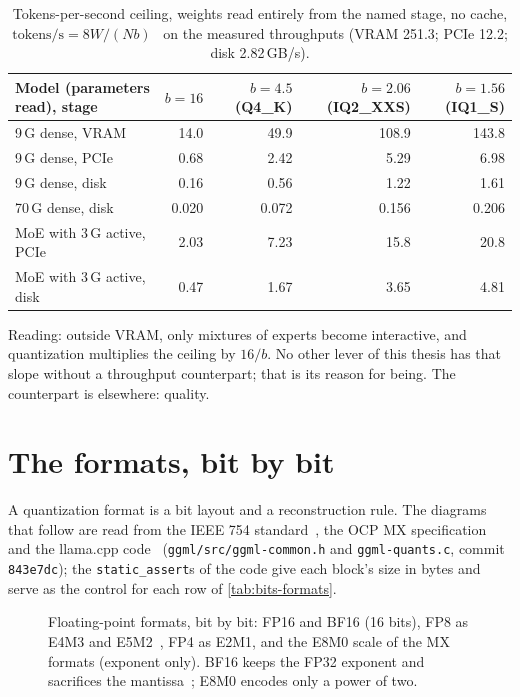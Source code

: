 \begin{table}[ht]
\centering\small
\caption[Ceilings versus bits per weight]{Tokens-per-second ceiling, weights read entirely from the named stage, no cache, $\text{tokens/s} = 8W/(Nb)$ \calc~on the measured throughputs (VRAM 251.3; PCIe 12.2; disk 2.82\,GB/s).}
\label{tab:quant-plafonds}
\begin{tabular}{@{}lrrrr@{}}
\toprule
Model (parameters read), stage & $b=16$ & $b=4.5$ (Q4\_K) & $b=2.06$ (IQ2\_XXS) & $b=1.56$ (IQ1\_S) \\
\midrule
9\,G dense, VRAM & 14.0 & 49.9 & 108.9 & 143.8 \\
9\,G dense, PCIe & 0.68 & 2.42 & 5.29 & 6.98 \\
9\,G dense, disk & 0.16 & 0.56 & 1.22 & 1.61 \\
70\,G dense, disk & 0.020 & 0.072 & 0.156 & 0.206 \\
MoE with 3\,G active, PCIe & 2.03 & 7.23 & 15.8 & 20.8 \\
MoE with 3\,G active, disk & 0.47 & 1.67 & 3.65 & 4.81 \\
\bottomrule
\end{tabular}
\end{table}

Reading: outside VRAM, only mixtures of experts become interactive, and quantization multiplies the ceiling by $16/b$. No other lever of this thesis has that slope without a throughput counterpart; that is its reason for being. The counterpart is elsewhere: quality.

\section{The formats, bit by bit}\label{sec:formats}

A quantization format is a bit layout and a reconstruction rule. The diagrams that follow are read from the IEEE 754 standard~\cite{ieee754}, the OCP MX specification~\cite{ocpmx2023,mx2023} and the llama.cpp code~\cite{llamacpp} (\texttt{ggml/src/ggml-common.h} and \texttt{ggml-quants.c}, commit \texttt{843e7dc}); the \texttt{static\_assert}s of the code give each block's size in bytes and serve as the control for each row of \cref{tab:bits-formats}.

\begin{figure}[ht]
\centering
\SchemaFlottants
\caption[Floating-point formats, bit by bit]{Floating-point formats, bit by bit: FP16 and BF16 (16 bits), FP8 as E4M3 and E5M2~\cite{micikevicius2022fp8}, FP4 as E2M1, and the E8M0 scale of the MX formats (exponent only). BF16 keeps the FP32 exponent and sacrifices the mantissa~\cite{kalamkar2019bf16}; E8M0 encodes only a power of two.}
\label{fig:flottants}
\end{figure}

